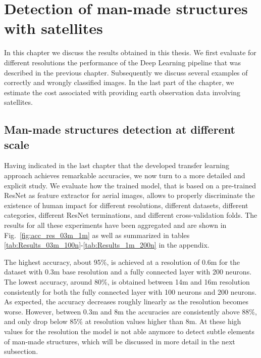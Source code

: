 
\chapter{Detection of man-made structures with satellites} 

\label{Chapter5}



In this chapter we discuss the results obtained in this thesis. We first evaluate for different resolutions the performance of the Deep Learning pipeline that was described in the previous chapter. Subsequently we discuss several examples of correctly and wrongly classified images. In the last part of the chapter, we estimate the cost associated with providing earth observation data involving satellites.

\section{Man-made structures detection at different scale}

Having indicated in the last chapter that the developed transfer learning approach achieves remarkable accuracies, we now turn to a more detailed and explicit study. We evaluate how the trained model, that is based on a pre-trained ResNet as feature extractor for aerial images, allows to properly discriminate the existence of human impact for different resolutions, different datasets, different categories, different ResNet terminations, and different cross-validation folds. The results for all these experiments have been aggregated and are shown in Fig.~\ref{fig:acc_res_03m_1m} as well as summarized in tables \ref{tab:Results_03m_100n}-\ref{tab:Results_1m_200n} in the appendix. 

The highest accuracy, about 95\%, is achieved at a resolution of 0.6m for the dataset with 0.3m base resolution and a fully connected layer with 200 neurons. The lowest accuracy, around 80\%, is obtained between 14m and 16m resolution consistently for both the fully connected layer with 100 neurons and 200 neurons. As expected, the accuracy decreases roughly linearly as the resolution becomes worse. However, between 0.3m and 8m the accuracies are consistently above 88\%, and only drop below 85\% at resolution values higher than 8m. At these high values for the resolution the model is not able anymore to detect subtle elements of man-made structures, which will be discussed in more detail in the next subsection.


